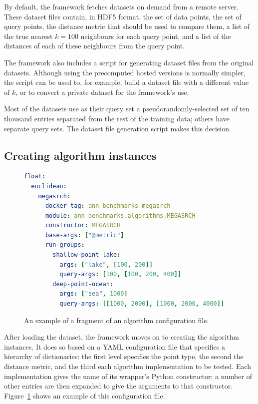 By default, the framework fetches datasets on demand from a remote server.
These dataset files contain, in HDF5 format,
the set of data points,
the set of query points,
the distance metric that should be used to compare them,
a list of the true nearest $k = 100$ neighbours for each query point,
and a list of the distances of each of these neighbours from the query point.

The framework also includes a script for generating dataset files from the
original datasets. Although using the precomputed hosted versions is normally
simpler, the script can be used to, for example, build a dataset file with a
different value of $k$, or to convert a private dataset for the framework's
use.

Most of the datasets use as their query set a pseudorandomly-selected set of
ten thousand entries separated from the rest of the training data; others have
separate query sets. The dataset file generation script makes this decision.

\subsection{Creating algorithm instances}

\begin{figure}[t!]
\vspace{-2em}
\begin{lstlisting}[language=yaml]
float:
  euclidean:
    megasrch:
      docker-tag: ann-benchmarks-megasrch
      module: ann_benchmarks.algorithms.MEGASRCH
      constructor: MEGASRCH
      base-args: ["@metric"]
      run-groups:
        shallow-point-lake:
          args: ["lake", [100, 200]]
          query-args: [100, [100, 200, 400]]
        deep-point-ocean:
          args: ["sea", 1000]
          query-args: [[1000, 2000], [1000, 2000, 4000]]
\end{lstlisting}
\vspace{-2em}
\caption{An example of a fragment of an algorithm configuration file.}
\label{fig:overview:example}
\end{figure}

After loading the dataset, the framework moves on to creating the algorithm
instances. It does so based on a YAML configuration file that specifies a
hierarchy of dictionaries: the first level specifies the point type, the second
the distance metric, and the third each algorithm implementation to be tested.
Each implementation
gives the name of its wrapper's Python constructor; a number of other entries
are then expanded to give the arguments to that constructor.
Figure~\ref{fig:overview:example} shows an example of this configuration file.

